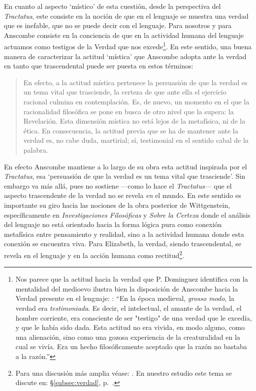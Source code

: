 En cuanto al aspecto `místico' de esta cuestión, desde la perspectiva del \emph{Tractatus}, este consiste en la noción de que en el lenguaje se muestra una verdad que es inefable, que no se puede decir con el lenguaje. Para nosotros y para Anscombe consiste en la conciencia de que en la actividad humana del lenguaje actuamos como testigos de la Verdad que nos excede\footnote{Nos parece que la actitud hacia la verdad que P. Dominguez identifica con la mentalidad del medioevo ilustra bien la disposición de Anscombe hacia la Verdad presente en el lenguaje: \Cite[354-355]{dominguez2009at}: \enquote{En la época medieval, \emph{grosso modo}, la verdad era \emph{testimoniada}. Es decir, el intelectual, el amante de la verdad, el hombre corriente, era consciente de ser "testigo" de una verdad que le excedía, y que le había sido dada. Esta actitud no era vivida, en modo alguno, como una alienación, sino como una gozosa experiencia de la creaturalidad en la cual se vivía. Era un hecho filosóficamente aceptado que la razón no bastaba a la razón.}}. En este sentido, una buena manera de caracterizar la actitud `mística' que Anscombe adopta ante la verdad en tanto que trascendental puede ser puesta en estos términos: \blockquote[{\Cite[357]{dominguez2009at}}]{En efecto, a la actitud mística pertenece la persuasión de que la verdad es un tema vital que trasciende, la certeza de que ante ella el ejercicio racional culmina en contemplación. Es, de nuevo, un momento en el que la racionalidad filosófica se pone en busca de otro nivel que la supera: la Revelación. Esta dimensión mística no está lejos de la metafísica, ni de la ética. \textelp{} En consecuencia, la actitud previa que se ha de mantener ante la verdad es, no cabe duda, martirial; sí, testimonial en el sentido cabal de la palabra.}

En efecto Anscombe mantiene a lo largo de su obra esta actitud inspirada por el \emph{Tractatus}, esa \enquote*{persuasión de que la verdad es un tema vital que trasciende}. Sin embargo va más allá, pues no sostiene ---como lo hace el \emph{Tractatus}--- que el aspecto trascendente de la verdad no se revela \emph{en} el mundo. En este sentido es importante su giro hacia las nociones de la obra posterior de Wittgenstein, específicamente en \emph{Investigaciones Filosóficas} y \emph{Sobre la Certeza} donde el análisis del lenguaje no está orientado hacia la forma lógica pura como conexión metafísica entre pensamiento y realidad, sino a la actividad humana donde esta conexión se encuentra viva. Para Elizabeth, la verdad, siendo trascendental, se revela en el lenguaje y en la acción humana como rectitud\footnote{Para una discusión más amplia véase: \Cite{torralbaynubiola2005fayeh:unidadverdad}. En nuestro estudio este tema se discute en: \S\ref{subsec:verdad}, p.~\pageref{subsec:verdad}.}.

